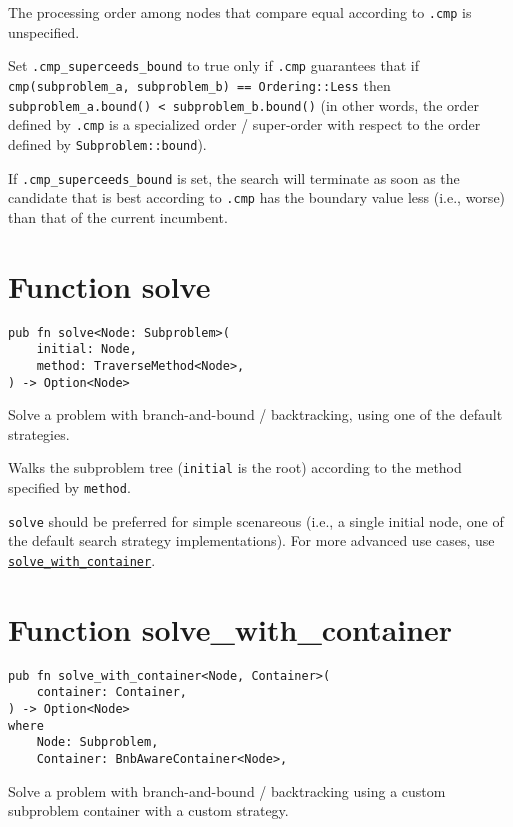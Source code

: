 The processing order among nodes that compare equal according to \texttt{.cmp} is unspecified.

Set \texttt{.cmp\_superceeds\_bound} to true only if \texttt{.cmp} guarantees that
if \texttt{cmp(subproblem\_a, subproblem\_b) == Ordering::Less}
then \texttt{subproblem\_a.bound() < subproblem\_b.bound()}
(in other words, the order defined by \texttt{.cmp} is a specialized order / super-order with respect to the order defined by \texttt{Subproblem::bound}).

If \texttt{.cmp\_superceeds\_bound} is set, the search will terminate as soon as the candidate that is best according to \texttt{.cmp} has the boundary value less (i.e., worse) than that of the current incumbent.

\section*{Function solve}

\hypertarget{apx:solve}{}

\begin{lstlisting}
pub fn solve<Node: Subproblem>(
    initial: Node,
    method: TraverseMethod<Node>,
) -> Option<Node>
\end{lstlisting}

Solve a problem with branch-and-bound / backtracking, using one of the default strategies.

Walks the subproblem tree (\texttt{initial} is the root) according to the method specified by \texttt{method}.

\texttt{solve} should be preferred for simple scenareous (i.e., a single initial node, one of the default search strategy implementations). For more advanced use cases, use \hyperlink{apx:solve_with_container}{\texttt{solve\_with\_container}}.

\section*{Function solve\_with\_container}

\hypertarget{apx:solve_with_container}{}

\begin{lstlisting}
pub fn solve_with_container<Node, Container>(
    container: Container,
) -> Option<Node>
where
    Node: Subproblem,
    Container: BnbAwareContainer<Node>,
\end{lstlisting}

Solve a problem with branch-and-bound / backtracking using a custom subproblem container with a custom strategy.

